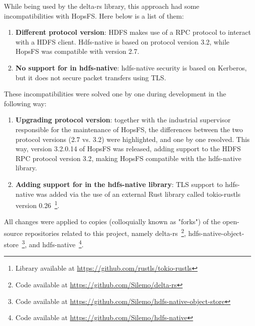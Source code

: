 While being used by the delta-rs library, this approach had some incompatibilities with \gls{HopsFS}. Here below is a list of them:
\begin{enumerate}
  \item \textbf{Different  protocol version}: \gls{HDFS} makes use of a \gls{RPC} protocol to interact with a \gls{HDFS} client. Hdfs-native is based on protocol version 3.2, while \gls{HopsFS} was compatible with version 2.7.
  \item \textbf{No support for  in hdfs-native}: hdfs-native security is based on Kerberos, but it does not secure packet transfers using \gls{TLS}.
\end{enumerate}
These incompatibilities were solved one by one during development in the following way:
\begin{enumerate}
  \item \textbf{Upgrading  protocol version}: together with the industrial supervisor responsible for the maintenance of \gls{HopsFS}, the differences between the two protocol versions (2.7 vs. 3.2) were highlighted, and one by one resolved. This way, version 3.2.0.14 of \gls{HopsFS} was released, adding support to the \gls{HDFS} \gls{RPC} protocol version 3.2, making \gls{HopsFS} compatible with the hdfs-native library.
  \item \textbf{Adding support for  in the hdfs-native library}: \gls{TLS} support to hdfs-native was added via the use of an external Rust library called tokio-rustls version 0.26~\footnote{Library available at \url{https://github.com/rustls/tokio-rustls}}.
\end{enumerate}

All changes were applied to copies (colloquially known as "forks") of the open-source repositories related to this project, namely delta-rs~\footnote{Code available at \url{https://github.com/Silemo/delta-rs}}, hdfs-native-object-store~\footnote{Code available at \url{https://github.com/Silemo/hdfs-native-object-store}}, and hdfs-native~\footnote{Code available at \url{https://github.com/Silemo/hdfs-native}}.